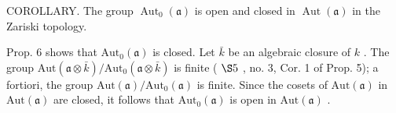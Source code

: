 COROLLARY. The group \(\operatorname{Aut}_{0}(\mathfrak{a})\) is open and closed in \(\operatorname{Aut}(\mathfrak{a})\) in the Zariski topology.

Prop. 6 shows that \(\mathrm{Aut}_0(\mathfrak{a})\) is closed. Let \(\bar{k}\) be an algebraic closure of \(k\) . The group \(\mathrm{Aut}(\mathfrak{a} \otimes \bar{k}) / \mathrm{Aut}_0(\mathfrak{a} \otimes \bar{k})\) is finite ( \(\S 5\) , no. 3, Cor. 1 of Prop. 5); a fortiori, the group \(\mathrm{Aut}(\mathfrak{a}) / \mathrm{Aut}_0(\mathfrak{a})\) is finite. Since the cosets of \(\mathrm{Aut}(\mathfrak{a})\) in \(\mathrm{Aut}(\mathfrak{a})\) are closed, it follows that \(\mathrm{Aut}_0(\mathfrak{a})\) is open in \(\mathrm{Aut}(\mathfrak{a})\) .